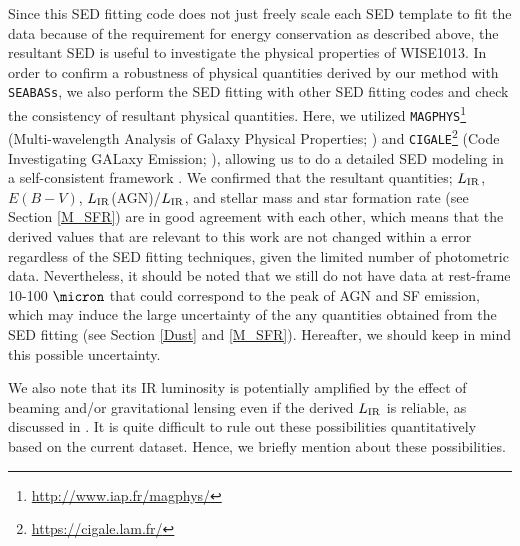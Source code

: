 \documentclass[twocolumn]{aastex6}
\begin{document}
Since this SED fitting code does not just freely scale each SED template to fit the data because of the requirement for energy conservation as described above, the resultant SED is useful to investigate the physical properties of WISE1013.
In order to confirm a robustness of physical quantities derived by our method with {\tt SEABASs}, we also  perform the SED fitting with other SED fitting codes and check the consistency of resultant physical quantities.
Here, we utilized {\tt MAGPHYS}\footnote{\url{http://www.iap.fr/magphys/}} (Multi-wavelength Analysis of Galaxy Physical Properties; \citealt{da_Cunha_08, da_Cunha_15}) and {\tt CIGALE}\footnote{\url{https://cigale.lam.fr/}} (Code Investigating GALaxy Emission; \citealt{Burgarella,Noll}), allowing us to do a detailed SED modeling in a self-consistent framework \citep[see also][]{Ciesla,Chang_17}.
We confirmed that the resultant quantities; $L_{\rm IR}$, $E(B-V)$, $L_{\rm IR}$(AGN)/$L_{\rm IR}$, and stellar mass and star formation rate (see Section \ref{M_SFR}) are in good agreement with each other, which means that the derived values that are relevant to this work are not changed within a error regardless of the SED fitting techniques, given the limited number of photometric data.
Nevertheless, it should be noted that we still do not have data at rest-frame 10-100 $\micron$ that could correspond to the peak of AGN and SF emission, which may induce the large uncertainty of the any quantities obtained from the SED fitting (see Section \ref{Dust} and \ref{M_SFR}).
Hereafter, we should keep in mind this possible uncertainty.
      
We also note that its IR luminosity is potentially amplified by the effect of beaming and/or gravitational lensing even if the derived $L_{\rm IR}$ is reliable, as discussed in \cite{Tsai}.
It is quite difficult to rule out these possibilities quantitatively based on the current dataset.
Hence, we briefly mention about these possibilities.
\end{document}

